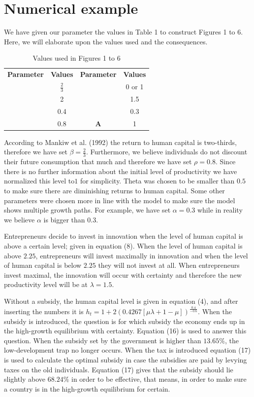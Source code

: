 \documentclass[a4paper,11pt]{article} %
\begin{document}
\section{Numerical example}
We have given our parameter the values in Table 1 to construct Figures 1 to 6. Here, we will elaborate upon the values  used and the consequences. 

\begin{table}[h]
\centering
\caption{Values used in Figures 1 to 6}
\begin{tabular}{c c c c}
  \toprule[1.5pt]
  \textbf{Parameter} & \textbf{Values} &  \textbf{Parameter} & \textbf{Values}\\
  \cmidrule(r){1-2}\cmidrule(l){3-4}
  \pmb{\(\beta\)} & \(\frac{2}{3}\) & \pmb{\(\mu\)} & 0 or 1 \\
  \pmb{\(\gamma\)} & 2 & \pmb{\(\lambda\)} & 1.5 \\
  \pmb{\(\theta\)} & 0.4 & \pmb{\(\alpha\)} & 0.3 \\
  \pmb{\(\rho\)} & 0.8 & \textbf{A} & 1 \\
  \bottomrule[1.5pt]
\end{tabular}
\end{table}

According to Mankiw et al. (1992) the return to human capital is two-thirds, therefore we have set \(\beta=\frac{2}{3}\). Furthermore, we believe individuals do not  discount their future consumption that much and therefore we have set \(\rho=0.8\). Since there is no further information about the initial level of productivity we have normalized this level to\(1\) for simplicity. Theta was chosen to be smaller than \(0.5\) to make sure there are diminishing returns to human capital. Some other parameters were chosen more in line with the model to make sure the model shows multiple growth paths. For example, we have set \(\alpha=0.3\) while in reality we believe \(\alpha\) is bigger than \(0.3\).

Entrepreneurs decide to invest in innovation when the level of human capital is above a certain level; given in equation (8). When the level of human capital is above \(2.25\), entrepreneurs will invest maximally in innovation and when the level of human capital is below \(2.25\) they will not invest at all. When entrepreneurs invest maximal, the innovation will occur with certainty and therefore the new productivity level will be at \(\lambda=1.5\).

Without a subsidy, the human capital level is given in equation (4), and after inserting the numbers it is \(h_t=1+2\left(0.4267\left[\mu\lambda+1-\mu\right]\right)^{\frac{0.4}{-0.6}}\). When the subsidy is introduced, the question is for which subsidy the economy ends up in the high-growth equilibrium with certainty. Equation (16) is used to answer this question. When the subsidy set by the government is higher than \(13.65\%\), the low-development trap no longer occurs. When the tax is introduced equation (17) is used to calculate the optimal subsidy in case the subsidies are paid by levying taxes on the old individuals. Equation (17) gives that the subsidy should lie slightly above \(68.24\%\) in order to be effective, that means, in order to make sure a country is in the high-growth equilibrium for certain.
\end{document}
